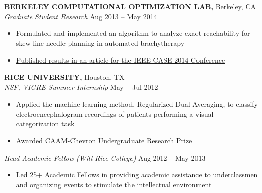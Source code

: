 \documentclass[geomargin]{res}
\begin{document}
\begin{resume}
{\bf BERKELEY COMPUTATIONAL OPTIMIZATION LAB,} Berkeley, CA \\
{\em Graduate Student Research} \hfill
Aug 2013 -- May 2014 \\                                          \vspace{-4mm}
\begin{itemize}                                         \itemsep1pt %
        \item    Formulated and implemented an algorithm to analyze exact reachability for skew-line needle planning in automated brachytherapy
        \item    \href{http://www.decf.berkeley.edu/~gyang/paper2014.pdf}{Published results in an article for the IEEE CASE 2014 Conference}
\end{itemize}
\vspace{-1mm}

{\bf RICE UNIVERSITY,} Houston, TX \\
{\em NSF, VIGRE Summer Internship}    \hfill
May -- Jul 2012 \\                                          \vspace{-4mm}
\begin{itemize}                                         \itemsep1pt 
        \item  Applied the machine learning method, Regularized Dual Averaging, to classify electroencephalogram  recordings of patients performing a visual categorization task
        \item Awarded CAAM-Chevron Undergraduate Research Prize
\end{itemize}
\vspace{-3mm}

{\em Head Academic Fellow (Will Rice College)} \hfill
Aug 2012 -- May 2013 \\                                          \vspace{-4mm}
\begin{itemize}                                         \itemsep1pt %
        \item   Led 25+ Academic Fellows in providing academic assistance to underclassmen and organizing events to stimulate the intellectual environment
\end{itemize}
\vspace{-1mm}


\end{resume}
\end{document}
